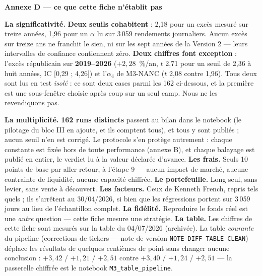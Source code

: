 \documentclass[9pt,a4paper]{extarticle}
\begin{document}
\vspace{0.8mm}
{\color{bleu}\bfseries Annexe D --- ce que cette fiche n'établit pas}\par
\vspace{0.6mm}
{\footnotesize
\textbf{La significativité.} \textbf{Deux seuils cohabitent} : 2,18 pour un excès mesuré sur treize années,
1,96 pour un $\alpha$ lu sur 3\,059 rendements journaliers. Aucun excès sur treize ans ne franchit le sien, ni
sur les sept années de la Version 2 --- leurs intervalles de confiance contiennent zéro. \textbf{Deux chiffres
font exception} : l'excès républicain sur \textbf{2019--2026} ($+2{,}28$~\%/an, $t$ 2,71 pour un seuil de 2,36
à huit années, IC [0,29 ; 4,26]) et l'$\alpha_4$ de M3-NANC ($t$ 2,08 contre 1,96). Tous deux sont lus en test
\emph{isolé} : ce sont deux cases parmi les 162 ci-dessous, et la première est une sous-fenêtre choisie après
coup sur un seul camp. Nous ne les revendiquons pas.\par
\vspace{0.5mm}
\textbf{La multiplicité.} \textbf{162 runs distincts} passent au bilan dans le notebook (le pilotage du
bloc III en ajoute, et ils comptent tous), et tous y sont publiés ;
aucun seuil n'en est corrigé. Le protocole s'en protège autrement : chaque constante est fixée hors de toute
performance (annexe B), et chaque balayage est publié en entier, le verdict lu à la valeur déclarée d'avance.
\textbf{Les frais.} Seuls 10 points de base par aller-retour, à l'étape 9 --- aucun impact de marché, aucune
contrainte de liquidité, aucune capacité chiffrée. \textbf{Le portefeuille.} Long seul, sans levier, sans
vente à découvert. \textbf{Les facteurs.} Ceux de Kenneth French, repris tels quels ; ils s'arrêtent au
30/04/2026, si bien que les régressions portent sur 3\,059 jours au lieu de l'échantillon complet.
\textbf{La fidélité.} Reproduire le fonds réel est une \emph{autre} question --- cette fiche mesure une
stratégie.
\textbf{La table.} Les chiffres de cette fiche sont mesurés sur la table du 04/07/2026 (archivée).
La table \emph{courante} du pipeline (corrections de tickers --- note de version
\texttt{NOTE\_DIFF\_TABLE\_CLEAN}) déplace les résultats de quelques centièmes de point sans changer
aucune conclusion : $+3{,}42$ / $+1{,}21$ / $+2{,}51$ contre $+3{,}40$ / $+1{,}24$ / $+2{,}51$ ---
la passerelle chiffrée est le notebook \texttt{M3\_table\_pipeline}.\par
}
\end{document}
